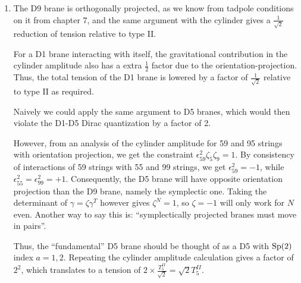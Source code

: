 \documentclass[11pt, class=article, crop=false]{standalone}
\begin{document}
\begin{enumerate}
	Now, taking $V_{IIB} \to \infty$, the two $\SL(2, \ZZ)$ symmetries remain unbroken. One of these can be identified with large diffeomorphisms of the torus, and so combines with spacetime diffeomorphisms in the large $V$ limit. The remaining $\SL(2, \ZZ)$ then becomes the S-duality group. The $\SO(8)$ gauge theory living at each of the vertices is not seen, since the singularities and accompanying D7 branes have ``flown off'' to infinity. 
	
	That $\Psi_{het}$ remains unaffected means that $G_{IIB} e^{-\Phi_{IIB}/2}$ is an invariant under $\SL(2, \ZZ)$. So the volume as measured in the frame of that modified metric is an invariant. This is exactly the Einstein frame metric. 
	
	We have also seen in the chapter that the M theory - heterotic E duality can be obtained through a chain of dualities involving heterotic O - type I together with the M theory - type IIA. We are only asked to reproduce dualities between \emph{string theories} in this question however. 
	
	\item The D9 brane is orthogonally projected, as we know from tadpole conditions on it from chapter 7, and the same argument with the cylinder gives a $\frac{1}{\sqrt2}$ reduction of tension relative to type II. 
	
	For a D1 brane interacting with itself, the gravitational contribution in the cylinder amplitude also has a extra $\frac12$ factor due to the orientation-projection. Thus, the total tension of the D1 brane is lowered by a factor of $\frac1{\sqrt{2}}$ relative to type II as required. 
	
	Naively we could apply the same argument to D5 branes, which would then violate the D1-D5 Dirac quantization by a factor of 2.
	
	However, from an analysis of the cylinder amplitude for 59 and 95 strings with orientation projection, we get the constraint $\epsilon^2_{59} \zeta_5 \zeta_9 = 1$. By consistency of interactions of 59 strings with 55 and 99 strings, we get $\epsilon_{59}^2 = -1$, while $\epsilon_{55}^2 = \epsilon_{99}^2 = +1$. Consequently, the D5 brane will have opposite orientation projection than the D9 brane, namely the symplectic one. Taking the determinant of $\gamma = \zeta \gamma^T$ however gives $\zeta^N = 1$, so $\zeta = -1$ will only work for $N$ even. Another way to say this is: ``symplectically projected branes must move in pairs''. 
	
	Thus, the ``fundamental'' D5 brane should be thought of as a D5 with $\mathrm{Sp}(2)$ index $a=1,2$. Repeating the cylinder amplitude calculation gives a factor of $2^2$, which translates to a tension of $2 \times \frac{T_5^{II}}{\sqrt2} = \sqrt2 T_5^{II}$.
	

\end{enumerate}
\end{document}
